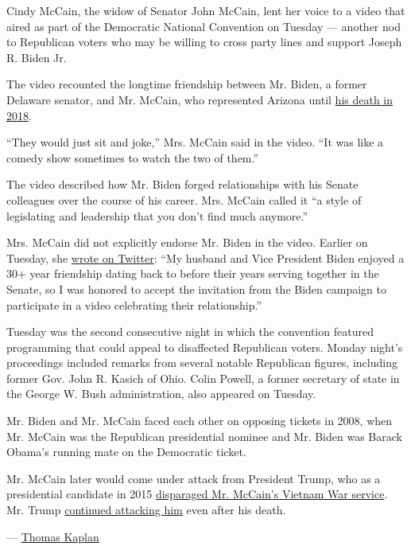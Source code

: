 Cindy McCain, the widow of Senator John McCain, lent her voice to a
video that aired as part of the Democratic National Convention on
Tuesday --- another nod to Republican voters who may be willing to cross
party lines and support Joseph R. Biden Jr.

The video recounted the longtime friendship between Mr. Biden, a former
Delaware senator, and Mr. McCain, who represented Arizona until
\href{https://www.nytimes3xbfgragh.onion/2018/08/25/obituaries/john-mccain-dead.html}{his
death in 2018}.

``They would just sit and joke,'' Mrs. McCain said in the video. ``It
was like a comedy show sometimes to watch the two of them.''

The video described how Mr. Biden forged relationships with his Senate
colleagues over the course of his career. Mrs. McCain called it ``a
style of legislating and leadership that you don't find much anymore.''

Mrs. McCain did not explicitly endorse Mr. Biden in the video. Earlier
on Tuesday, she
\href{https://twitter.com/cindymccain/status/1295845241841360897}{wrote
on Twitter}: ``My husband and Vice President Biden enjoyed a 30+ year
friendship dating back to before their years serving together in the
Senate, so I was honored to accept the invitation from the Biden
campaign to participate in a video celebrating their relationship.''

Tuesday was the second consecutive night in which the convention
featured programming that could appeal to disaffected Republican voters.
Monday night's proceedings included remarks from several notable
Republican figures, including former Gov. John R. Kasich of Ohio. Colin
Powell, a former secretary of state in the George W. Bush
administration, also appeared on Tuesday.

Mr. Biden and Mr. McCain faced each other on opposing tickets in 2008,
when Mr. McCain was the Republican presidential nominee and Mr. Biden
was Barack Obama's running mate on the Democratic ticket.

Mr. McCain later would come under attack from President Trump, who as a
presidential candidate in 2015
\href{https://www.nytimes3xbfgragh.onion/2015/07/19/us/politics/trump-belittles-mccains-war-record.html}{disparaged
Mr. McCain's Vietnam War service}. Mr. Trump
\href{https://www.nytimes3xbfgragh.onion/2019/03/20/us/politics/trump-john-mccain.html}{continued
attacking him} even after his death.

--- \href{https://www.nytimes3xbfgragh.onion/by/thomas-kaplan}{Thomas
Kaplan}

